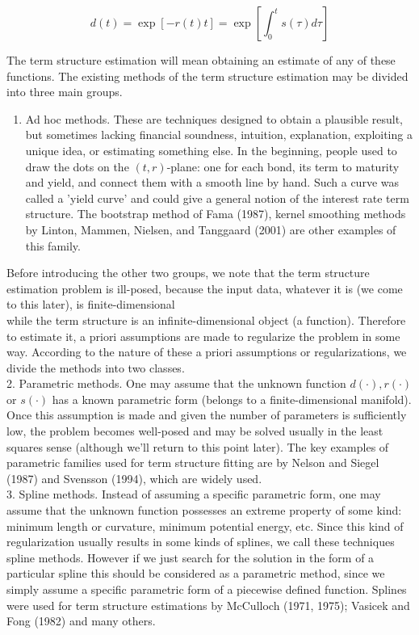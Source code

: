 \documentclass[10pt]{article}
\begin{document}
$$
d(t)=\exp [-r(t) t]=\exp \left[\int_{0}^{t} s(\tau) d \tau\right]
$$

The term structure estimation will mean obtaining an estimate of any of these functions. The existing methods of the term structure estimation may be divided into three main groups.

\begin{enumerate}
  \item Ad hoc methods. These are techniques designed to obtain a plausible result, but sometimes lacking financial soundness, intuition, explanation, exploiting a unique idea, or estimating something else. In the beginning, people used to draw the dots on the $(t, r)$-plane: one for each bond, its term to maturity and yield, and connect them with a smooth line by hand. Such a curve was called a 'yield curve' and could give a general notion of the interest rate term structure. The bootstrap method of Fama (1987), kernel smoothing methods by Linton, Mammen, Nielsen, and Tanggaard (2001) are other examples of this family.
\end{enumerate}

Before introducing the other two groups, we note that the term structure estimation problem is ill-posed, because the input data, whatever it is (we come to this later), is finite-dimensional\\
while the term structure is an infinite-dimensional object (a function). Therefore to estimate it, a priori assumptions are made to regularize the problem in some way. According to the nature of these a priori assumptions or regularizations, we divide the methods into two classes.\\
2. Parametric methods. One may assume that the unknown function $d(\cdot), r(\cdot)$ or $s(\cdot)$ has a known parametric form (belongs to a finite-dimensional manifold). Once this assumption is made and given the number of parameters is sufficiently low, the problem becomes well-posed and may be solved usually in the least squares sense (although we'll return to this point later). The key examples of parametric families used for term structure fitting are by Nelson and Siegel (1987) and Svensson (1994), which are widely used.\\
3. Spline methods. Instead of assuming a specific parametric form, one may assume that the unknown function possesses an extreme property of some kind: minimum length or curvature, minimum potential energy, etc. Since this kind of regularization usually results in some kinds of splines, we call these techniques spline methods. However if we just search for the solution in the form of a particular spline this should be considered as a parametric method, since we simply assume a specific parametric form of a piecewise defined function. Splines were used for term structure estimations by McCulloch (1971, 1975); Vasicek and Fong (1982) and many others.
\end{document}
